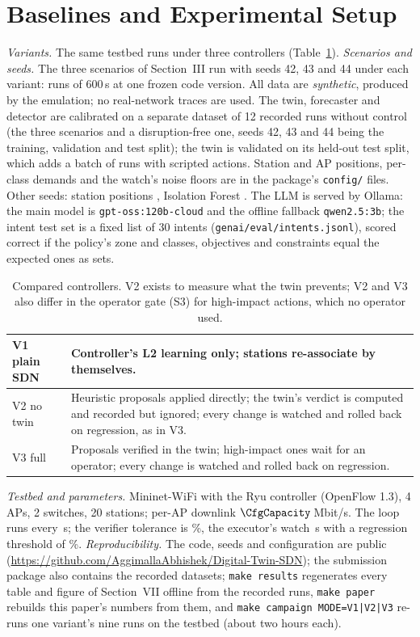 \documentclass[conference]{IEEEtran}
\begin{document}
\section{Baselines and Experimental Setup}
\emph{Variants.} The same testbed runs under three controllers (Table~\ref{tab:variants}). \emph{Scenarios and seeds.} The three scenarios of Section~III run with seeds 42, 43 and 44 under each variant: \NumRuns{} runs of 600\,s at one frozen code version. All data are \emph{synthetic}, produced by the emulation; no real-network traces are used. The twin, forecaster and detector are calibrated on a separate dataset of 12 recorded runs without control (the three scenarios and a disruption-free one, seeds 42, 43 and 44 being the training, validation and test split); the twin is validated on its held-out test split, which adds a batch of runs with scripted actions. Station and AP positions, per-class demands and the watch's noise floors are in the package's \texttt{config/} files. Other seeds: station positions \CfgStationSeed, Isolation Forest \CfgForestSeed. The LLM is served by Ollama: the main model is \texttt{gpt-oss:120b-cloud} and the offline fallback \texttt{qwen2.5:3b}; the intent test set is a fixed list of 30 intents (\texttt{genai/eval/intents.jsonl}), scored correct if the policy's zone and classes, objectives and constraints equal the expected ones as sets.

\begin{table}[t]
\caption{Compared controllers. V2 exists to measure what the twin prevents; V2 and V3 also differ in the operator gate (S3) for high-impact actions, which no operator used.}
\label{tab:variants}
\centering\small
\begin{tabular}{|l|p{5.8cm}|}
\hline
V1 plain SDN & Controller's L2 learning only; stations re-associate by themselves.\\
\hline
V2 no twin & Heuristic proposals applied directly; the twin's verdict is computed and recorded but ignored; every change is watched and rolled back on regression, as in V3.\\
\hline
V3 full & Proposals verified in the twin; high-impact ones wait for an operator; every change is watched and rolled back on regression.\\
\hline
\end{tabular}
\end{table}

\emph{Testbed and parameters.} Mininet-WiFi with the Ryu controller (OpenFlow 1.3), 4 APs, 2 switches, 20 stations; per-AP downlink $\CfgCapacity$\,Mbit/s. The loop runs every \CfgPeriod\,s; the verifier tolerance is \CfgChangePct\%, the executor's watch \CfgWatch\,s with a regression threshold of \CfgRegressPct\%. \emph{Reproducibility.} The code, seeds and configuration are public (\url{https://github.com/AggimallaAbhishek/Digital-Twin-SDN}); the submission package also contains the recorded datasets; \texttt{make results} regenerates every table and figure of Section~VII offline from the recorded runs, \texttt{make paper} rebuilds this paper's numbers from them, and \texttt{make campaign MODE=V1|V2|V3} re-runs one variant's nine runs on the testbed (about two hours each).
\end{document}
